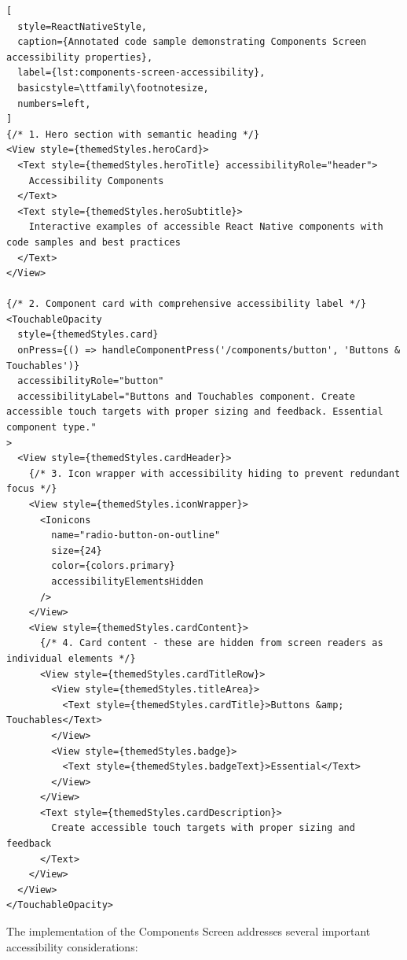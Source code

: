\begin{lstlisting}[
  style=ReactNativeStyle,
  caption={Annotated code sample demonstrating Components Screen accessibility properties},
  label={lst:components-screen-accessibility},
  basicstyle=\ttfamily\footnotesize,
  numbers=left,
]
{/* 1. Hero section with semantic heading */}
<View style={themedStyles.heroCard}>
  <Text style={themedStyles.heroTitle} accessibilityRole="header">
    Accessibility Components
  </Text>
  <Text style={themedStyles.heroSubtitle}>
    Interactive examples of accessible React Native components with code samples and best practices
  </Text>
</View>

{/* 2. Component card with comprehensive accessibility label */}
<TouchableOpacity
  style={themedStyles.card}
  onPress={() => handleComponentPress('/components/button', 'Buttons & Touchables')}
  accessibilityRole="button"
  accessibilityLabel="Buttons and Touchables component. Create accessible touch targets with proper sizing and feedback. Essential component type."
>
  <View style={themedStyles.cardHeader}>
    {/* 3. Icon wrapper with accessibility hiding to prevent redundant focus */}
    <View style={themedStyles.iconWrapper}>
      <Ionicons
        name="radio-button-on-outline"
        size={24}
        color={colors.primary}
        accessibilityElementsHidden
      />
    </View>
    <View style={themedStyles.cardContent}>
      {/* 4. Card content - these are hidden from screen readers as individual elements */}
      <View style={themedStyles.cardTitleRow}>
        <View style={themedStyles.titleArea}>
          <Text style={themedStyles.cardTitle}>Buttons &amp; Touchables</Text>
        </View>
        <View style={themedStyles.badge}>
          <Text style={themedStyles.badgeText}>Essential</Text>
        </View>
      </View>
      <Text style={themedStyles.cardDescription}>
        Create accessible touch targets with proper sizing and feedback
      </Text>
    </View>
  </View>
</TouchableOpacity>
\end{lstlisting}

The implementation of the Components Screen addresses several important accessibility considerations:

